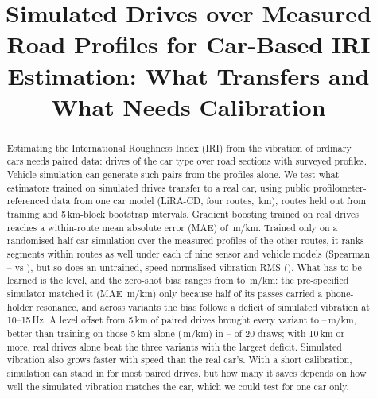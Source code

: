 \documentclass[conference]{IEEEtran}
\begin{document}
\raggedbottom
\makeatletter{}\makeatother %

\title{Simulated Drives over Measured Road Profiles for Car-Based IRI Estimation: What Transfers and What Needs Calibration}

\author{
\and
{}
}

\maketitle

\begin{abstract}
Estimating the International Roughness Index (IRI) from the vibration of ordinary cars needs paired data: drives of the car type over road sections with surveyed profiles. Vehicle simulation can generate such pairs from the profiles alone. We test what estimators trained on simulated drives transfer to a real car, using public profilometer-referenced data from one car model (LiRA-CD, four routes, \liraKm\,km), routes held out from training and 5\,km-block bootstrap intervals. Gradient boosting trained on real drives reaches a within-route mean absolute error (MAE) of \vrGbmMaeWithin\,m/km. Trained only on a randomised half-car simulation over the measured profiles of the other routes, it ranks segments within routes as well under each of nine sensor and vehicle models (Spearman \vvRhoMin--\vvRhoMax{} vs \vrGbmRhoWithin), but so does an untrained, speed-normalised vibration RMS (\rkHalfRho). What has to be learned is the level, and the zero-shot bias ranges from \vvBiasMin{} to \vvBiasMax\,m/km: the pre-specified simulator matched it (MAE \vrSimVzeroMaeWithin\,m/km) only because half of its passes carried a phone-holder resonance, and across variants the bias follows a deficit of simulated vibration at 10--15\,Hz. A level offset from 5\,km of paired drives brought every variant to \pcCalMaeFiveMin--\pcCalMaeFiveMax\,m/km, better than training on those 5\,km alone (\vbRealOnlyFive\,m/km) in \pcCalWinsFiveMin--\pcCalWinsFiveMax{} of 20 draws; with 10\,km or more, real drives alone beat the three variants with the largest deficit. Simulated vibration also grows faster with speed than the real car's. With a short calibration, simulation can stand in for most paired drives, but how many it saves depends on how well the simulated vibration matches the car, which we could test for one car only.
\end{abstract}
\end{document}
